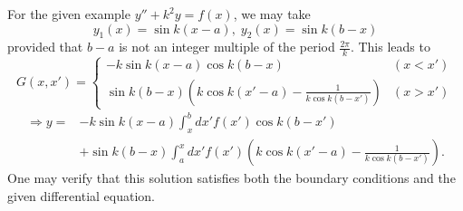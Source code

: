 For the given example $y'' + k^2 y = f(x)$, we may take
\[
	y_1(x) = \sin k(x - a),\; y_2(x) = \sin k(b - x)
\]
provided that $b - a$ is not an integer multiple of the period $\frac{2\pi}{k}$.
This leads to
\[
	G(x, x') = 
	\begin{cases}
		-k\sin k(x - a) \cos k(b - x) & (x < x') \\
		\sin k(b - x) \left( k\cos k(x' - a) - \frac{1}{k \cos k (b - x')} \right) & (x > x')
	\end{cases}
\]
\begin{align*}
	\Rightarrow y
	= &-k\sin k(x - a) \int_x^b dx' f(x') \cos k(b - x')\\
	  &+ \sin k(b - x) \int_a^x dx' f(x') \left( k\cos k(x' - a) - \frac{1}{k \cos k (b - x')} \right).
\end{align*}
One may verify that this solution satisfies both the boundary conditions and the given differential equation.
